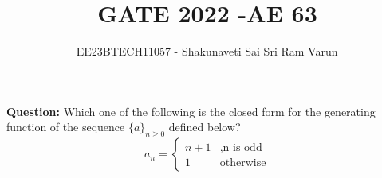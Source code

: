 \documentclass[journal,12pt,twocolumn]{IEEEtran}
\theoremstyle{remark}
\begin{document}

\vspace{3cm}

\title{GATE 2022  -AE 63}
\author{EE23BTECH11057 - Shakunaveti Sai Sri Ram Varun$^{}$%
}
\maketitle
\newpage
\bigskip
\vspace{2cm}
\textbf{Question: }
Which one of the following is the closed form for the generating function of the sequence $ \bigl\{ a \bigl\}_{n \geq0}$ defined below?
\begin{equation}
a_n=
    \begin{cases}
        n+1 & , \text{n is odd}\\
        1 & \text{otherwise}
    \end{cases}
\end{equation}\label{eq: 22cs361}
\end{document}
